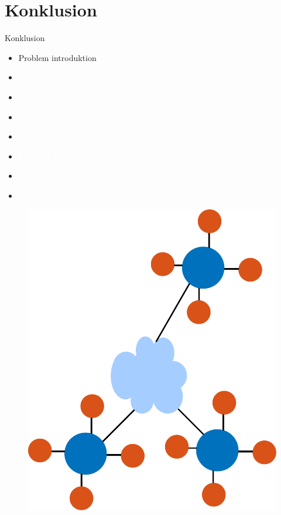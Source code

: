 \section{Konklusion}
\begin{frame}{Konklusion}
	\begin{minipage}{0.5\textwidth}
		\begin{itemize}
		\item Problem introduktion
		\item[] \textcolor{white} {Eksisterende modeller}
		\item[] \textcolor{white} {Parameter bestemmelse}
		\item[] \textcolor{white} {Test \& målinger}
		\item[] \textcolor{white} {Databehandling}
		\item[] \textcolor{white} {Foreslået PL model}
		\item[] \textcolor{white} {Model sammenligning}
		\item[] \textcolor{white} {z parameteren}
		\end{itemize}
	\end{minipage}%
	\begin{minipage}{0.5\textwidth}
		\begin{figure}[H]
			\centering
			\includegraphics[width=\columnwidth]{figures/wsn_ill.pdf}
		\end{figure}
	\end{minipage}%
\end{frame}

